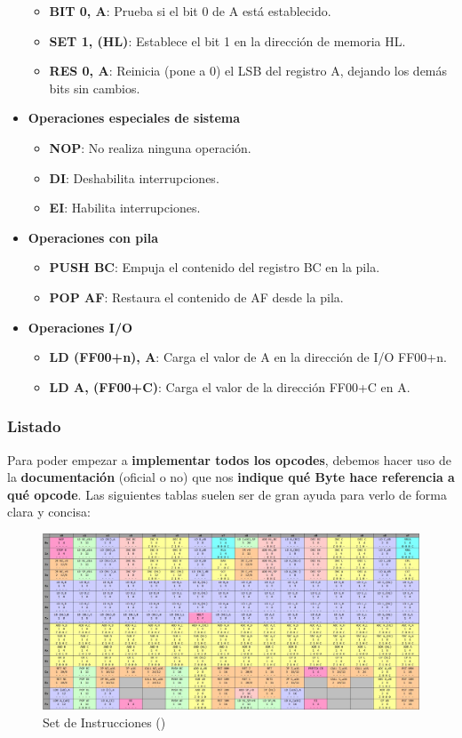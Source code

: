 \begin{itemize}
\begin{itemize}
  \item \textbf{BIT 0, A}: Prueba si el bit 0 de A está establecido.
  \item \textbf{SET 1, (HL)}: Establece el bit 1 en la dirección de memoria HL.
  \item \textbf{RES 0, A}: Reinicia (pone a 0) el LSB del registro A, dejando los demás bits sin cambios.
  \end{itemize}
  \item \textbf{Operaciones especiales de sistema}
  \begin{itemize}
  \item \textbf{NOP}: No realiza ninguna operación.
  \item \textbf{DI}: Deshabilita interrupciones.
  \item \textbf{EI}: Habilita interrupciones.
  \end{itemize}
  \item \textbf{Operaciones con pila}
  \begin{itemize}
  \item \textbf{PUSH BC}: Empuja el contenido del registro BC en la pila.
  \item \textbf{POP AF}: Restaura el contenido de AF desde la pila.
  \end{itemize}
  \item \textbf{Operaciones I/O}
  \begin{itemize}
  \item \textbf{LD (FF00+n), A}: Carga el valor de A en la dirección de I/O FF00+n.
  \item \textbf{LD A, (FF00+C)}: Carga el valor de la dirección FF00+C en A.
  \end{itemize}
\end{itemize}

\subsubsection{Listado}
Para poder empezar a \textbf{implementar todos los opcodes}, debemos hacer uso de la \textbf{documentación} (oficial o no) que nos \textbf{indique qué Byte hace referencia a qué opcode}. Las siguientes tablas suelen ser de gran ayuda para verlo de forma clara y concisa:

\begin{figure}[H]
\centering
\includegraphics[width=1\textwidth]{include/images/opcodes_1.jpg}
\caption{Set de Instrucciones (\cite{opcodes})}
\label{figure:opcodes_1}
\end{figure}

